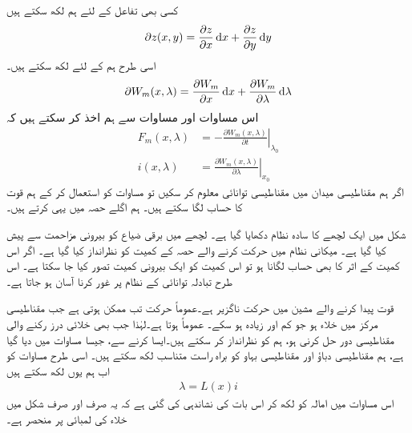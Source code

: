 	کسی بھی تفاعل  کے لئے ہم لکھ سکتے ہیں
\begin{align}\label{مساوات_تبادلہ_جزوی_تفرق_عمومی_الف}
\partial z(x,y)=\frac{\partial z}{\partial x} \dif x+\frac{\partial z}{\partial y} \dif y
\end{align}
اسی طرح ہم  کے لئے لکھ سکتے ہیں۔
\begin{align}\label{مساوات_تبادلہ_جزوی_تفرق_عمومی_ب}
\partial W_m(x,\lambda)=\frac{\partial W_m}{\partial x}\dif x+\frac{\partial W_m}{\partial \lambda}\dif \lambda
\end{align}
اس مساوات اور مساوات  سے ہم اخذ کر سکتے ہیں کہ
\begin{align}
F_m(x,\lambda)&=-\left. \frac{\partial W_m(x,\lambda)}{\partial t}\right|_{\lambda_0}\label{مساوات_تبادلہ_توانائی_قوت_برقی_رو}\\
i(x,\lambda)&=\left. \frac{\partial W_m(x,\lambda)}{\partial \lambda}\right|_{x_0}\label{مساوات_تبادلہ_توانائی_سے_رو}
\end{align}
اگر ہم مقناطیسی میدان میں مقناطیسی توانائی  معلوم کر سکیں تو مساوات   کو استعمال کر کے ہم قوت کا حساب لگا سکتے ہیں۔ ہم اگلے حصہ میں یہی کرتے ہیں۔

شکل   میں  ایک لچھے کا سادہ نظام دکھایا گیا ہے۔ لچھے میں برقی ضیاع کو بیرونی مزاحمت سے پیش کیا گیا ہے۔ میکانی نظام میں حرکت کرنے والے حصہ کے کمیت کو نظرانداز کیا گیا ہے۔ اگر اس کمیت  کے اثر کا بھی حساب لگانا ہو تو اس کمیت کو ایک بیرونی کمیت تصور کیا جا سکتا ہے۔ اس طرح تبادلہ توانائی کے نظام پر غور کرنا آسان ہو جاتا ہے۔ 

قوت پیدا کرنے والے مشین میں حرکت ناگزیر ہے۔عموماً حرکت تب ممکن ہوتی ہے جب مقناطیسی مرکز میں خلاء ہو جو کم اور زیادہ ہو سکے۔  عموماً  ہوتا ہے۔لہٰذا جب بھی خلائی درز رکنے والی  مقناطیسی دور حل کرنی ہو،  ہم  کو نظرانداز کر سکتے ہیں۔ایسا کرنے سے، جیسا مساوات   میں دیا گیا ہے، ہم  مقناطیسی دباؤ  اور مقناطیسی بہاو  کو براہ راست متناسب لکھ سکتے ہیں۔ اسی طرح مساوات    کو اب  ہم  یوں لکھ سکتے ہیں
\begin{align}\label{مساوات_تبادلہ_ارتباط_بہاو_اور_امالہ}
\lambda=L(x) i
\end{align}
اس مساوات میں امالہ  کو  لکھ کر اس بات کی نشاندہی کی گئی ہے کہ یہ صرف اور صرف  شکل    میں خلاء کی لمبائی  پر منحصر ہے۔

